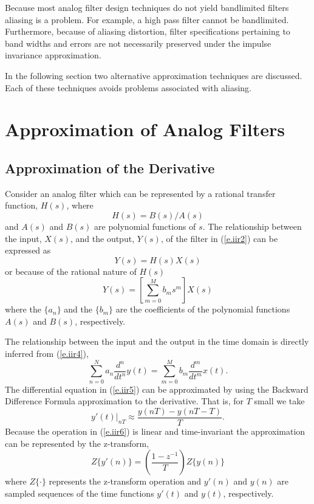 	Because most analog filter design techniques
do not yield bandlimited filters aliasing is a problem.
For example, a high pass filter cannot be bandlimited.  Furthermore,
because of aliasing distortion, filter specifications pertaining
to band widths and errors are not necessarily preserved under the
impulse invariance approximation.

	In the following section two alternative
approximation techniques are discussed.  Each of these techniques avoids 
problems associated with aliasing.
\section{Approximation of Analog Filters}
\subsection{Approximation of the Derivative}

	Consider an analog filter which can be 
represented by a rational transfer function, $H(s)$,
where
%
\begin{equation}
H(s)=B(s)/A(s)
\label{e.iir2}
\end{equation}
%
and $A(s)$ and $B(s)$ are polynomial functions of $s$.
The relationship between the input, $X(s)$, and the output,
$Y(s)$, of the filter in (\ref{e.iir2}) can be expressed as
%
\begin{equation}
Y(s)=H(s)X(s)
\label{e.iir3}
\end{equation}
%
or because of the rational nature of $H(s)$
%
\begin{equation}
[\sum_{n=0}^{N}a_ns^n]Y(s)=[\sum_{m=0}^{M}b_ms^m]X(s)
\label{e.iir4}
\end{equation}
%
where the $\{a_n\}$ and the $\{b_m\}$ are the coefficients of the
polynomial functions $A(s)$ and $B(s)$, respectively.

	The relationship between the input and the output in the time domain 
is directly inferred from (\ref{e.iir4}),
%
\begin{equation}
\sum_{n=0}^{N}a_n\frac{d^n}{dt^n}y(t)=\sum_{m=0}^{M}b_m\frac{d^m}{dt^m}x(t).
\label{e.iir5}
\end{equation}
%
The differential equation in (\ref{e.iir5}) can be approximated
by using the Backward Difference Formula approximation to the 
derivative.  That is, for $T$ small we take
%
\begin{equation}
y'(t)|_{nT}\approx \frac{y(nT)-y(nT-T)}{T}.
\label{e.iir6}
\end{equation}
%
Because the operation in (\ref{e.iir6}) is linear and time-invariant
the approximation can be represented by
the z-transform,
%
\begin{equation}
Z\{y'(n)\}=(\frac{1-z^{-1}}{T})Z\{y(n)\}
\label{e.iir7}
\end{equation}
%
where $Z\{\cdot\}$ represents the z-transform operation and
$y'(n)$ and $y(n)$ are sampled sequences of the time functions
$y'(t)$ and $y(t)$, respectively.

